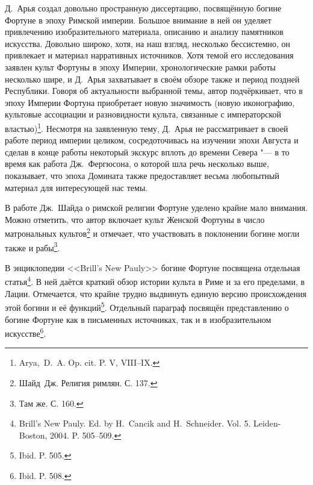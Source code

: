 Д.~Арья создал довольно пространную диссертацию, посвящённую богине Фортуне в эпоху Римской империи. Большое внимание в ней он уделяет привлечению изобразительного материала, описанию и анализу памятников искусства. Довольно широко, хотя, на наш взгляд, несколько бессистемно, он привлекает и материал нарративных источников. Хотя темой его исследования заявлен культ Фортуны в эпоху Империи, хронологические рамки работы несколько шире, и Д.~Арья захватывает в своём обзоре также и период поздней Республики. Говоря об актуальности выбранной темы, автор подчёркивает, что в эпоху Империи Фортуна приобретает новую значимость (новую иконографию, культовые ассоциации и разновидности культа, связанные с императорской властью)\footnote{Arya,~D.~A. Op. cit. P. V, VIII--IX.}. Несмотря на заявленную тему, Д.~Арья не рассматривает в своей работе период империи целиком, сосредоточивась на изучении эпохи Августа и сделав в конце работы некоторый экскурс вплоть до времени Севера "--- в то время как работа Дж.~Фергюсона, о которой шла речь несколько выше, показывает, что эпоха Домината также предоставляет весьма любопытный материал для интересующей нас темы.

В работе Дж.~Шайда о римской религии Фортуне уделено крайне мало внимания. Можно отметить, что автор включает культ Женской Фортуны в число матрональных культов\footnote{Шайд~Дж. Религия римлян. С. 137.} и отмечает, что участвовать в поклонении богине могли также и рабы\footnote{Там же. С. 160.}.

В энциклопедии <<Brill's New Pauly>> богине Фортуне посвящена отдельная статья\footnote{Brill's New Pauly. Ed. by H.~Cancik and H.~Schneider. Vol. 5. Leiden-Boston, 2004. P. 505--509.}. В ней даётся краткий обзор истории культа в Риме и за его пределами, в Лации. Отмечается, что крайне трудно выдвинуть единую версию происхождения этой богини и её функций\footnote{Ibid. P. 505.}. Отдельный параграф посвящён представлению о богине Фортуне как в письменных источниках, так и в изобразительном искусстве\footnote{Ibid. P. 508.}.


